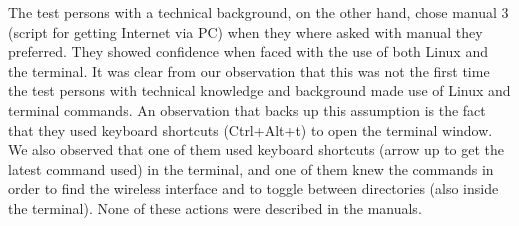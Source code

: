 The test persons with a technical background, on the other hand, chose manual 3 (script for getting Internet via PC) when they where asked with manual they preferred. They showed confidence when faced with the use of both Linux and the terminal. It was clear from our observation that this was not the first time the test persons with technical knowledge and background made use of Linux and terminal commands. An observation that backs up this assumption is the fact that they used keyboard shortcuts (Ctrl+Alt+t) to open the terminal window. We also observed that one of them used keyboard shortcuts (arrow up to get the latest command used) in the terminal, and one of them knew the commands in order to find the wireless interface and to toggle between directories (also inside the terminal). None of these actions were described in the manuals.  

